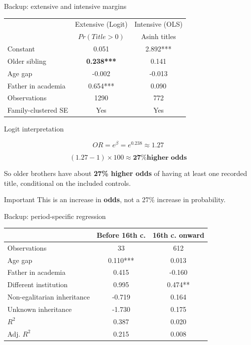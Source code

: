\documentclass[aspectratio=169,10pt]{beamer}
\begin{document}
\begin{frame}{Backup: extensive and intensive margins}

\centering
\small

\begin{tabular}{lcc}
\toprule
 & Extensive (Logit) & Intensive (OLS)\\
 & \(Pr(Title>0)\) & Asinh titles\\
\midrule
Constant & 0.051 & 2.892***\\
Older sibling & \textbf{0.238***} & 0.141\\
Age gap & -0.002 & -0.013\\
Father in academia & 0.654*** & 0.090\\
\midrule
Observations & 1290 & 772\\
Family-clustered SE & Yes & Yes\\
\bottomrule
\end{tabular}

\vspace{0.6em}

\begin{block}{Logit interpretation}
\footnotesize

\[
OR=e^{\beta}=e^{0.238}\approx1.27
\]

\[
(1.27-1)\times100\approx\textbf{27\% higher odds}
\]

So older brothers have about \textbf{27\% higher odds}
of having at least one recorded title, conditional on the included controls.

\end{block}

\begin{alertblock}{Important}
\footnotesize
This is an increase in \textbf{odds}, not a 27\% increase in probability.
\end{alertblock}

\end{frame}

\begin{frame}{Backup: period-specific regression}
\centering
\small
\begin{tabular}{lcc}
\toprule
 & Before 16th c. & 16th c. onward\\
\midrule
Observations & 33 & 612\\
Age gap & 0.110*** & 0.013\\
Father in academia & 0.415 & -0.160\\
Different institution & 0.995 & 0.474**\\
Non-egalitarian inheritance & -0.719 & 0.164\\
Unknown inheritance & -1.730 & 0.175\\
\(R^2\) & 0.387 & 0.020\\
Adj. \(R^2\) & 0.215 & 0.008\\
\bottomrule
\end{tabular}
\end{frame}
\end{document}
